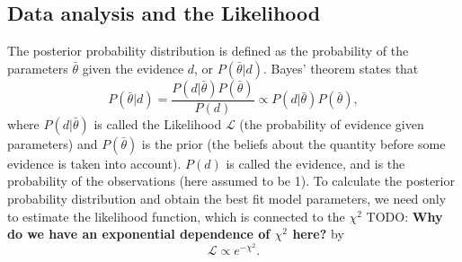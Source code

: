 \documentclass[aps,pre,twocolumn,letterpaper,floatfix,showpacs]{revtex4}
\newcommand{\todo}[1]{ {\color{Magenta} TODO: \color{Blue} \textbf{#1} }}
\begin{document}






\subsection{Data analysis and the Likelihood}

The posterior probability distribution is defined as the probability of the parameters
$\bar \theta$ given the evidence $d$, or $P(\bar \theta | d)$. Bayes' theorem states that 
\begin{equation}
P(\bar \theta | d) = \frac{P(d | \bar \theta)P(\bar \theta)}{P(d)} \propto P(d | \bar \theta)P(\bar \theta),
\end{equation}
where $P(d | \bar \theta)$ is called the Likelihood $\mathcal L$ (the probability of
evidence given parameters) and $P(\bar \theta)$ is the prior (the beliefs about the
quantity before some evidence is taken into account). $P(d)$ is called the evidence,
and is the probability of the observations (here assumed to be 1). 
To calculate the posterior probability distribution and obtain the best fit model parameters, we need only
to estimate the likelihood function, which is connected to the $\chi^2$\todo{Why do we have an exponential dependence of $\chi^2$ here?} by 
\begin{equation}
\mathcal L \propto e^{-\chi^2}.
\end{equation}
\end{document}
